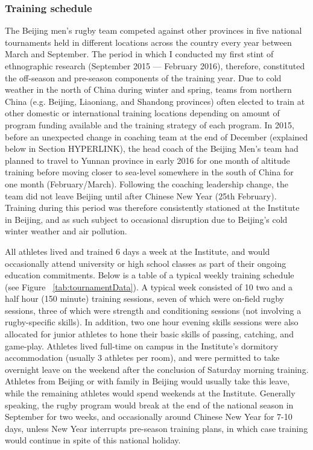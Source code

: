 

  \subsubsection{Training schedule}

   The Beijing men's rugby team competed against other provinces in five national tournaments held in different locations across the country   every year between March and September. The period in which I conducted my first stint of ethnographic research (September 2015 –-- February 2016), therefore, constituted the off-season and pre-season components of the training year.  Due to cold weather in the north of China during winter and spring, teams from northern China (e.g. Beijing, Liaoniang, and Shandong provinces) often elected to train   at other domestic or international training locations depending on amount of program funding available and the training strategy of each program.  In 2015, before an unexpected change in coaching team at the end of December (explained below in Section HYPERLINK), the head coach of the Beijing Men's team had planned to travel to Yunnan province in early 2016 for one month of altitude training before moving closer to sea-level somewhere in the south of China for one month (February/March).  Following the coaching leadership change, the team did not leave Beijing until after Chinese New Year (25th February). Training during this period was therefore consistently stationed at the Institute in Beijing, and as such subject to occasional disruption due to Beijing's cold winter weather and air pollution.

   All athletes lived and trained 6 days a week at the Institute, and would occasionally attend university or high school classes as part of their ongoing education commitments.  Below is a table of a typical weekly training schedule (see Figure ~\ref{tab:tournamentData}). A typical week consisted of 10 two and a half hour (150 minute) training sessions, seven of which were on-field rugby sessions, three of which were strength and conditioning sessions (not involving a rugby-specific skills).  In addition, two one hour evening skills sessions were also allocated for junior athletes to hone their basic skills of passing, catching, and game-play.  Athletes lived full-time on campus in the Institute's dormitory accommodation (usually 3 athletes per room), and were permitted to take overnight leave on the weekend after the conclusion of Saturday morning training.  Athletes from Beijing or with family in Beijing would usually take this leave, while the remaining athletes would spend weekends at the Institute.  Generally speaking, the rugby program would break at the end of the national season in September for two weeks, and occasionally around Chinese New Year for 7-10 days, unless New Year interrupts pre-season training plans, in which case training would continue in spite of this national holiday.

